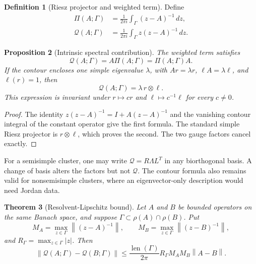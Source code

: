 \documentclass[11pt]{article}
\newtheorem{theorem}{Theorem}[section]
\newtheorem{proposition}[theorem]{Proposition}
\theoremstyle{definition}
\newtheorem{definition}[theorem]{Definition}
\theoremstyle{remark}
\newcommand{\norm}[1]{\left\lVert #1\right\rVert}
\newcommand{\cQ}{\mathcal Q}
\newcommand{\len}{\operatorname{len}}
\begin{document}
\begin{definition}[Riesz projector and weighted term]
\label{def:weighted-riesz}
Define
\begin{align}
 \Pi(A;\Gamma)
 &=\frac{1}{2\pi i}\int_\Gamma(z-A)^{-1}\,dz,
 \label{eq:riesz-projector}\\
 \cQ(A;\Gamma)
 &=\frac{1}{2\pi i}\int_\Gamma z(z-A)^{-1}\,dz.
 \label{eq:weighted-riesz}
\end{align}
\end{definition}

\begin{proposition}[Intrinsic spectral contribution]
\label{prop:intrinsic}
The weighted term satisfies
\[
 \cQ(A;\Gamma)=A\Pi(A;\Gamma)=\Pi(A;\Gamma)A.
\]
If the contour encloses one simple eigenvalue $\lambda$, with
$Ar=\lambda r$, $\ell A=\lambda\ell$, and $\ell(r)=1$, then
\begin{equation}
 \cQ(A;\Gamma)=\lambda\,r\otimes\ell.
 \label{eq:simple-term}
\end{equation}
This expression is invariant under $r\mapsto cr$ and
$\ell\mapsto c^{-1}\ell$ for every $c\ne0$.
\end{proposition}

\begin{proof}
The identity $z(z-A)^{-1}=I+A(z-A)^{-1}$ and the vanishing contour integral
of the constant operator give the first formula.  The standard simple Riesz
projector is $r\otimes\ell$, which proves the second.  The two gauge factors
cancel exactly.
\end{proof}

For a semisimple cluster, one may write $\cQ=R\Lambda L^T$ in any
biorthogonal basis.  A change of basis alters the factors but not $\cQ$.
The contour formula also remains valid for nonsemisimple clusters, where an
eigenvector-only description would need Jordan data.

\begin{theorem}[Resolvent-Lipschitz bound]
\label{thm:resolvent-lipschitz}
Let $A$ and $B$ be bounded operators on the same Banach space, and suppose
$\Gamma\subset\rho(A)\cap\rho(B)$.  Put
\[
 M_A=\max_{z\in\Gamma}\norm{(z-A)^{-1}},\qquad
 M_B=\max_{z\in\Gamma}\norm{(z-B)^{-1}},
\]
and $R_\Gamma=\max_{z\in\Gamma}|z|$.  Then
\begin{equation}
 \boxed{
 \norm{\cQ(A;\Gamma)-\cQ(B;\Gamma)}
 \le
 \frac{\len(\Gamma)}{2\pi}R_\Gamma M_AM_B\norm{A-B}.}
 \label{eq:resolvent-lipschitz}
\end{equation}
\end{theorem}
\end{document}
